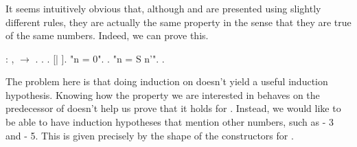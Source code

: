 \documentclass[12pt]{report}
\begin{document}
\subsubsection{ }

 It seems intuitively obvious that, although  and
     are presented using slightly different rules, they are
    actually the same property in the sense that they are true of the
    same numbers.  Indeed, we can prove this. \begin{coqdoccode}
\coqdocemptyline
\coqdocnoindent
{}  : \coqdockw{\ensuremath{\forall}} , \coqdoceol
\coqdocindent{1.00em}
  \ensuremath{\rightarrow}  .\coqdoceol
\coqdocnoindent
{}.\coqdoceol
\coqdocindent{1.50em}
.    [| ].\coqdoceol
\coqdocindent{1.50em}
 "n = 0".  .\coqdoceol
\coqdocindent{1.50em}
 "n = S n'". \coqdocnoindent
{}.\coqdoceol
\coqdocemptyline
\end{coqdoccode}
The problem here is that doing induction on  doesn't yield a
    useful induction hypothesis. Knowing how the property we are
    interested in behaves on the predecessor of  doesn't help us
    prove that it holds for . Instead, we would like to be able to
    have induction hypotheses that mention other numbers, such as  -
    3 and  - 5. This is given precisely by the shape of the
    constructors for . 

\subsubsection{ }
\end{document}
